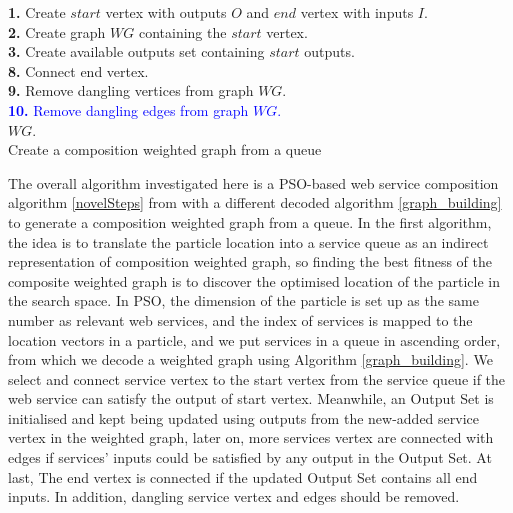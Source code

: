 \documentclass{llncs}
\begin{document}
\begin{algorithm}[!htb]
 \setlength{}
 \let\oldnl\nl%
\newcommand{\nonl}{\renewcommand{\nl}{\let\nl\oldnl}}
 \textbf{1.} Create $start$ vertex with outputs $O$ and $end$ vertex with inputs $I$.\\
 \textbf{2.} Create graph $WG$ containing the $start$ vertex.\\
 \textbf{3.} Create available outputs set containing $start$ outputs.\\
 \textbf{8.} Connect end vertex.\\
 \textbf{9.} Remove dangling vertices from graph $WG$.\\
 \textcolor{blue}{\textbf{10.} Remove dangling edges from graph $WG$.\\}
 \KwRet $WG$.\\
 \caption{Create a composition weighted graph from a queue}	
\label{graph_building}
\end{algorithm}

The overall algorithm investigated here is a PSO-based web service composition algorithm \ref{novelSteps} from   \cite{da2016particle} with a different decoded algorithm \ref{graph_building} to generate a composition weighted graph from a queue. In the first algorithm, the idea is to translate the particle location into a service queue as an indirect representation of composition weighted graph, so finding the best fitness of the composite weighted graph is to discover the optimised location of the particle in the search space. In PSO, the dimension of the particle is set up as the same number as relevant web services, and the index of services is mapped to the location vectors in a particle, and we put services in a queue in ascending order, from which we decode a weighted graph using Algorithm \ref{graph_building}. We select and connect  service vertex to the start vertex from the service queue if the web service can satisfy the output of start vertex. Meanwhile, an Output Set is initialised and kept being updated using outputs from the new-added service vertex in the weighted graph, later on, more services vertex are connected with edges if services' inputs could be satisfied by any output in the Output Set. At last, The end vertex is connected if the updated Output Set contains all end inputs. In addition, dangling service vertex and edges should be removed. 
\end{document}
